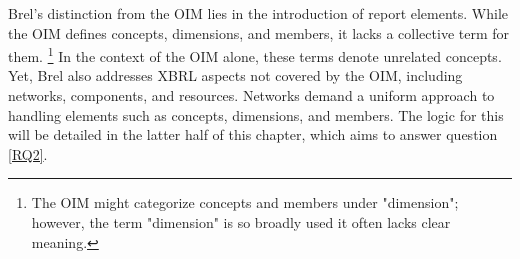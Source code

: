
Brel's distinction from the OIM lies in the introduction of report elements.
While the OIM defines concepts, dimensions, and members, it lacks a collective term for them.
\footnote{The OIM might categorize concepts and members under "dimension"; however, the term "dimension" is so broadly used it often lacks clear meaning.}
In the context of the OIM alone, these terms denote unrelated concepts.
Yet, Brel also addresses XBRL aspects not covered by the OIM, including networks, components, and resources.
Networks demand a uniform approach to handling elements such as concepts, dimensions, and members.
The logic for this will be detailed in the latter half of this chapter, which aims to answer question \ref{RQ2}.


